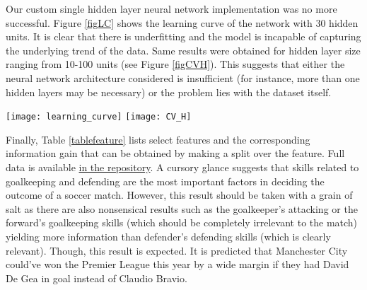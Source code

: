 \documentclass[a4paper,11pt,table]{article}
\begin{document}
Our custom single hidden layer neural network implementation was no more successful. Figure \ref{figLC} shows the learning curve of the network with 30 hidden units. It is clear that there is underfitting and the model is incapable of capturing the underlying trend of the data. Same results were obtained for hidden layer size ranging from 10-100 units (see Figure \ref{figCVH}). This suggests that either the neural network architecture considered is insufficient (for instance, more than one hidden layers may be necessary) or the problem lies with the dataset itself.
\clearpage~\\
\begin{center}
    \texttt{[image: learning\_curve]}
    \texttt{[image: CV\_H]}
\end{center}

Finally, Table \ref{tablefeature} lists select features and the corresponding information gain that can be obtained by making a split over the feature. Full data is available \href{https://github.com/TheLordBlarg/Soccer_Success/blob/master/results/entropy_train.csv}{in the repository}. A cursory glance suggests that skills related to goalkeeping and defending are the most important factors in deciding the outcome of a soccer match. However, this result should be taken with a grain of salt as there are also nonsensical results such as the goalkeeper's attacking or the forward's goalkeeping skills (which should be completely irrelevant to the match) yielding more information than defender's defending skills (which is clearly relevant). Though, this result is expected. It is predicted that Manchester City could've won the Premier League this year by a wide margin if they had David De Gea in goal instead of Claudio Bravio.
\end{document}
